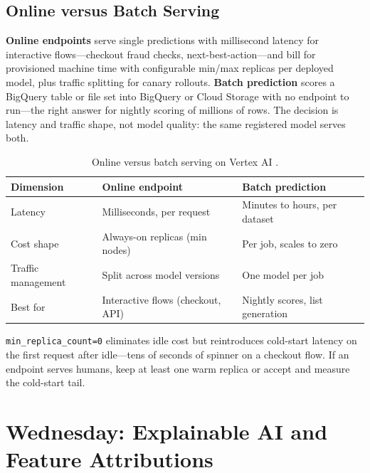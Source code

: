 \subsection{Online versus Batch Serving}
\textbf{Online endpoints} serve single predictions with millisecond latency for interactive flows---checkout fraud checks, next-best-action---and bill for provisioned machine time with configurable min/max replicas per deployed model, plus traffic splitting for canary rollouts. \textbf{Batch prediction} scores a BigQuery table or file set into BigQuery or Cloud Storage with no endpoint to run---the right answer for nightly scoring of millions of rows. The decision is latency and traffic shape, not model quality: the same registered model serves both.

\begin{table}[H]
\centering
\small
\begin{tabular}{@{}p{3.6cm}p{4.4cm}p{4.4cm}@{}} \\
\toprule
\textbf{Dimension} & \textbf{Online endpoint} & \textbf{Batch prediction} \\
\midrule
Latency & Milliseconds, per request & Minutes to hours, per dataset \\
Cost shape & Always-on replicas (min nodes) & Per job, scales to zero \\
Traffic management & Split across model versions & One model per job \\
Best for & Interactive flows (checkout, API) & Nightly scores, list generation \\
\bottomrule
\end{tabular}
\caption{Online versus batch serving on Vertex AI \cite{googlecloudvertexaidocs}.}
\label{tab:ch18-online-vs-batch}
\end{table}

\begin{pitfall}
\texttt{min\_replica\_count=0} eliminates idle cost but reintroduces cold-start latency on the first request after idle---tens of seconds of spinner on a checkout flow. If an endpoint serves humans, keep at least one warm replica or accept and measure the cold-start tail.
\end{pitfall}

\section{Wednesday: Explainable AI and Feature Attributions}


